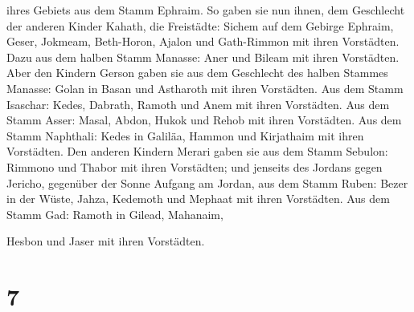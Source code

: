 ihres Gebiets aus dem Stamm Ephraim.  So gaben sie nun
ihnen, dem Geschlecht der anderen Kinder Kahath, die Freistädte: Sichem
auf dem Gebirge Ephraim, Geser,  Jokmeam, Beth-Horon,
 Ajalon und Gath-Rimmon mit ihren Vorstädten.
 Dazu aus dem halben Stamm Manasse: Aner und Bileam mit
ihren Vorstädten.  Aber den Kindern Gerson gaben sie aus
dem Geschlecht des halben Stammes Manasse: Golan in Basan und Astharoth
mit ihren Vorstädten.  Aus dem Stamm Isaschar: Kedes,
Dabrath,  Ramoth und Anem mit ihren Vorstädten.
 Aus dem Stamm Asser: Masal, Abdon,  Hukok
und Rehob mit ihren Vorstädten.  Aus dem Stamm Naphthali:
Kedes in Galiläa, Hammon und Kirjathaim mit ihren Vorstädten.
 Den anderen Kindern Merari gaben sie aus dem Stamm
Sebulon: Rimmono und Thabor mit ihren Vorstädten;  und
jenseits des Jordans gegen Jericho, gegenüber der Sonne Aufgang am
Jordan, aus dem Stamm Ruben: Bezer in der Wüste, Jahza, 
Kedemoth und Mephaat mit ihren Vorstädten.  Aus dem Stamm
Gad: Ramoth in Gilead, Mahanaim,

 Hesbon und Jaser mit ihren Vorstädten.

\hypertarget{section-6}{%
\section{7}\label{section-6}}


